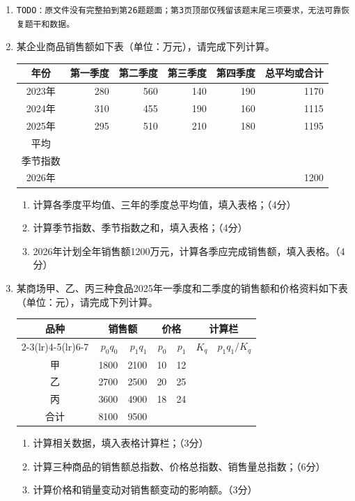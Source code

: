\documentclass[UTF8,a4paper,10pt]{ctexart}
\begin{document}
\begin{enumerate}[start=26]
\item \texttt{TODO：原文件没有完整拍到第26题题面；第3页顶部仅残留该题末尾三项要求，无法可靠恢复题干和数据。}
\item 某企业商品销售额如下表（单位：万元），请完成下列计算。
\begin{center}\begin{tabular}{crrrrr}\toprule 年份&第一季度&第二季度&第三季度&第四季度&总平均或合计\\\midrule2023年&280&560&140&190&1170\\2024年&310&455&190&160&1115\\2025年&295&510&210&180&1195\\平均&&&&&\\季节指数&&&&&\\2026年&&&&&1200\\\bottomrule\end{tabular}\end{center}
\begin{enumerate}[label=（\arabic*）,leftmargin=2.8em]\item 计算各季度平均值、三年的季度总平均值，填入表格；（4分）\item 计算季节指数、季节指数之和，填入表格；（4分）\item 2026年计划全年销售额1200万元，计算各季应完成销售额，填入表格。（4分）\end{enumerate}
\item 某商场甲、乙、丙三种食品2025年一季度和二季度的销售额和价格资料如下表（单位：元），请完成下列计算。
\begin{center}\begin{tabular}{crrrrrr}\toprule\multirow{2}{*}{品种}&\multicolumn{2}{c}{销售额}&\multicolumn{2}{c}{价格}&\multicolumn{2}{c}{计算栏}\\\cmidrule(lr){2-3}\cmidrule(lr){4-5}\cmidrule(lr){6-7}&$p_0q_0$&$p_1q_1$&$p_0$&$p_1$&$K_q$&$p_1q_1/K_q$\\\midrule 甲&1800&2100&10&12&&\\乙&2700&2500&20&25&&\\丙&3600&4900&18&24&&\\合计&8100&9500&&&&\\\bottomrule\end{tabular}\end{center}
\begin{enumerate}[label=（\arabic*）,leftmargin=2.8em]\item 计算相关数据，填入表格计算栏；（3分）\item 计算三种商品的销售额总指数、价格总指数、销售量总指数；（6分）\item 计算价格和销量变动对销售额变动的影响额。（3分）\end{enumerate}
\end{enumerate}
\end{document}
